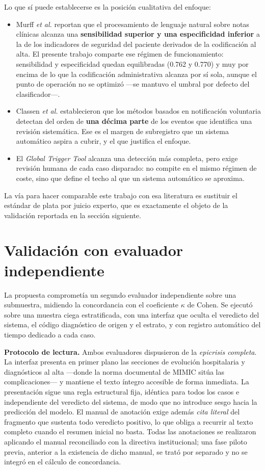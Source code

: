 \documentclass[conference]{IEEEtran}
\begin{document}
Lo que sí puede establecerse es la posición cualitativa del enfoque:

\begin{itemize}
\item Murff \emph{et al.} \cite{murff} reportan que el procesamiento de
lenguaje natural sobre notas clínicas alcanza una \textbf{sensibilidad
superior y una especificidad inferior} a la de los indicadores de seguridad
del paciente derivados de la codificación al alta. El presente trabajo comparte
ese régimen de funcionamiento: sensibilidad y especificidad quedan
equilibradas (0.762 y 0.770) y muy por
encima de lo que la codificación administrativa alcanza por sí sola, aunque el
punto de operación no se optimizó ---se mantuvo el umbral por defecto del
clasificador---.
\item Classen \emph{et al.} \cite{classen} establecieron que los métodos
basados en notificación voluntaria detectan del orden de \textbf{una décima
parte} de los eventos que identifica una revisión sistemática. Ese es el
margen de subregistro que un sistema automático aspira a cubrir, y el que
justifica el enfoque.
\item El \emph{Global Trigger Tool} alcanza una detección más completa, pero
exige revisión humana de cada caso disparado: no compite en el mismo régimen
de coste, sino que define el techo al que un sistema automático se aproxima.
\end{itemize}

La vía para hacer comparable este trabajo con esa literatura es sustituir el
estándar de plata por juicio experto, que es exactamente el objeto de la
validación reportada en la sección siguiente.

\section{Validación con evaluador independiente}
La propuesta comprometía un segundo evaluador independiente sobre una
submuestra, midiendo la concordancia con el coeficiente $\kappa$ de Cohen. Se
ejecutó sobre una muestra ciega estratificada, con una interfaz que oculta el
veredicto del sistema, el código diagnóstico de origen y el estrato, y con
registro automático del tiempo dedicado a cada caso.

\textbf{Protocolo de lectura.} Ambos evaluadores dispusieron de la
\emph{epicrisis completa}. La interfaz presenta en primer plano las secciones
de evolución hospitalaria y diagnósticos al alta ---donde la norma documental
de MIMIC sitúa las complicaciones--- y mantiene el texto íntegro accesible de
forma inmediata. La presentación sigue una regla estructural fija, idéntica
para todos los casos e independiente del veredicto del sistema, de modo que no
introduce sesgo hacia la predicción del modelo. El manual de anotación exige
además \emph{cita literal} del fragmento que sustenta todo veredicto positivo,
lo que obliga a recurrir al texto completo cuando el resumen inicial no basta.
Todas las anotaciones se realizaron aplicando el manual reconciliado con la
directiva institucional; una fase piloto previa, anterior a la existencia de
dicho manual, se trató por separado y no se integró en el cálculo de
concordancia.
\end{document}
